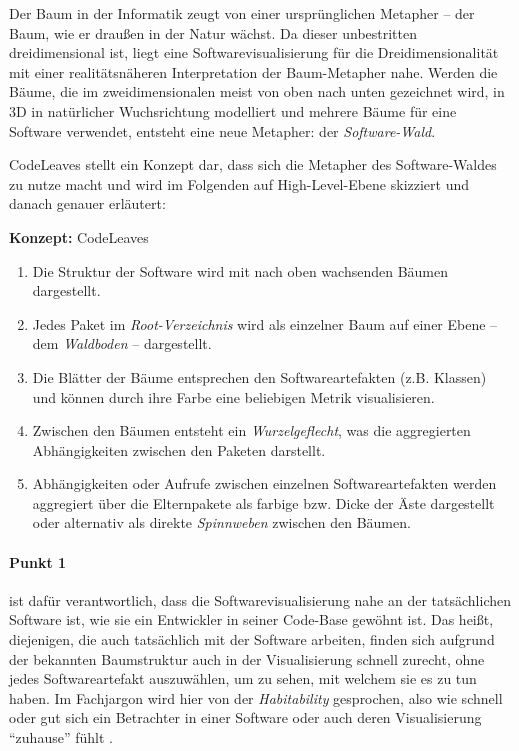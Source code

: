 Der Baum in der Informatik zeugt von einer ursprünglichen Metapher -- der Baum, wie er draußen in der Natur wächst. Da dieser unbestritten dreidimensional ist, liegt eine Softwarevisualisierung für die Dreidimensionalität mit einer realitätsnäheren Interpretation der Baum-Metapher nahe. Werden die Bäume, die im zweidimensionalen meist von oben nach unten gezeichnet wird, in 3D in natürlicher Wuchsrichtung modelliert und mehrere Bäume für eine Software verwendet, entsteht eine neue Metapher: der \emph{Software-Wald}.

CodeLeaves stellt ein Konzept dar, dass sich die Metapher des Software-Waldes zu nutze macht und wird im Folgenden auf High-Level-Ebene skizziert und danach genauer erläutert:

\begin{titlebox}{\textbf{Konzept:} CodeLeaves}
  \begin{enumerate}
    \item Die Struktur der Software wird mit nach oben wachsenden Bäumen dargestellt.
    \item Jedes Paket im \emph{Root-Verzeichnis} wird als einzelner Baum auf einer Ebene -- dem \emph{Waldboden} -- dargestellt.
    \item Die Blätter der Bäume entsprechen den Softwareartefakten (z.B. Klassen) und können durch ihre Farbe eine beliebigen Metrik visualisieren. 
    \item Zwischen den Bäumen entsteht ein \emph{Wurzelgeflecht}, was die aggregierten Abhängigkeiten zwischen den Paketen darstellt.
    \item Abhängigkeiten oder Aufrufe zwischen einzelnen Softwareartefakten werden aggregiert über die Elternpakete als farbige bzw. Dicke der Äste dargestellt oder alternativ als direkte \emph{Spinnweben} zwischen den Bäumen.
  \end{enumerate}
\end{titlebox}

\paragraph{Punkt 1} ist dafür verantwortlich, dass die Softwarevisualisierung nahe an der tatsächlichen Software ist, wie sie ein Entwickler in seiner Code-Base gewöhnt ist. Das heißt, diejenigen, die auch tatsächlich mit der Software arbeiten, finden sich aufgrund der bekannten Baumstruktur auch in der Visualisierung schnell zurecht, ohne jedes Softwareartefakt auszuwählen, um zu sehen, mit welchem sie es zu tun haben. Im Fachjargon wird hier von der \emph{Habitability} gesprochen, also wie schnell oder gut sich ein Betrachter in einer Software oder auch deren Visualisierung "`zuhause"' fühlt \cite{wettel2007program}.

